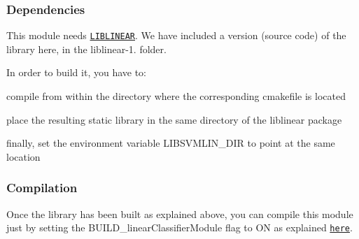 \subsubsection*{Dependencies}

This module needs \href{https://www.csie.ntu.edu.tw/~cjlin/liblinear/}{\tt L\+I\+B\+L\+I\+N\+E\+AR}. We have included a version (source code) of the library here, in the {\ttfamily liblinear-\/1.} folder.

In order to build it, you have to\+:


\begin{DoxyItemize}
\item compile from within the directory where the corresponding {\ttfamily cmakefile} is located
\item place the resulting static library in the same directory of the {\ttfamily liblinear} package
\item finally, set the environment variable {\ttfamily L\+I\+B\+S\+V\+M\+L\+I\+N\+\_\+\+D\+IR} to point at the same location
\end{DoxyItemize}

\subsubsection*{Compilation}

Once the library has been built as explained above, you can compile this module just by setting the {\ttfamily B\+U\+I\+L\+D\+\_\+linear\+Classifier\+Module} flag to {\ttfamily ON} as explained \href{https://www.github.com/robotology/himrep/#compilation}{\tt here}. 